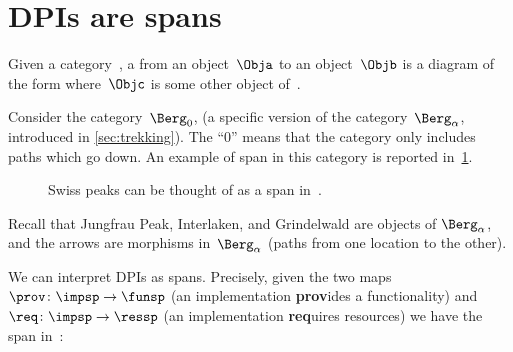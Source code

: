 
\section{DPIs are spans}
\label{sec:spans}


\begin{ctdefinition}[Span]
    \label{def:span}
    Given a category~\CatC, a \emph{} from an object~$\Obja$ to an object~$\Objb$ is a diagram of the form
    where~$\Objc$ is some other object of~\CatC.
\end{ctdefinition}

\begin{example}
    Consider the category~$\Berg_0$, (a specific version of the category~$\Berg_\alpha$, introduced in \cref{sec:trekking}).
    The ``0'' means that the category only includes paths which go down.
    An example of span in this category is reported in~\cref{fig:exmountains}.
    \begin{figure}[h!]
        \centering
        \caption{Swiss peaks can be thought of as a span in~\Berg.}
        \label{fig:exmountains}
    \end{figure}
    Recall that \textsf{Jungfrau Peak}, \textsf{Interlaken}, and \textsf{Grindelwald} are objects of $\Berg_\alpha$, and the arrows are morphisms in~$\Berg_\alpha$ (paths from one location to the other).
\end{example}

We can interpret DPIs as spans.
Precisely, given the two maps~$\prov \colon \impsp \to \funsp$ (an implementation \textbf{prov}ides a functionality) and~$\req\colon \impsp \to \ressp$ (an implementation \textbf{req}uires resources) we have the span in~\Set:
%

